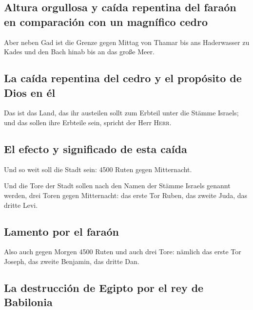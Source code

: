 \hypertarget{altura-orgullosa-y-cauxedda-repentina-del-farauxf3n-en-comparaciuxf3n-con-un-magnuxedfico-cedro}{%
\subsection{Altura orgullosa y caída repentina del faraón en comparación
con un magnífico
cedro}\label{altura-orgullosa-y-cauxedda-repentina-del-farauxf3n-en-comparaciuxf3n-con-un-magnuxedfico-cedro}}

 Aber neben Gad ist die Grenze gegen Mittag von Thamar
bis ans Haderwasser zu Kades und den Bach hinab bis an das große Meer.

\hypertarget{la-cauxedda-repentina-del-cedro-y-el-propuxf3sito-de-dios-en-uxe9l}{%
\subsection{La caída repentina del cedro y el propósito de Dios en
él}\label{la-cauxedda-repentina-del-cedro-y-el-propuxf3sito-de-dios-en-uxe9l}}

 Das ist das Land, das ihr austeilen sollt zum Erbteil
unter die Stämme Israels; und das sollen ihre Erbteile sein, spricht der
Herr \textsc{Herr}.

\hypertarget{el-efecto-y-significado-de-esta-cauxedda}{%
\subsection{El efecto y significado de esta
caída}\label{el-efecto-y-significado-de-esta-cauxedda}}

 Und so weit soll die Stadt sein: 4500 Ruten gegen
Mitternacht.

 Und die Tore der Stadt sollen nach den Namen der Stämme
Israels genannt werden, drei Toren gegen Mitternacht: das erste Tor
Ruben, das zweite Juda, das dritte Levi.

\hypertarget{lamento-por-el-farauxf3n}{%
\subsection{Lamento por el faraón}\label{lamento-por-el-farauxf3n}}

 Also auch gegen Morgen 4500 Ruten und auch drei Tore:
nämlich das erste Tor Joseph, das zweite Benjamin, das dritte Dan.

\hypertarget{la-destrucciuxf3n-de-egipto-por-el-rey-de-babilonia}{%
\subsection{La destrucción de Egipto por el rey de
Babilonia}\label{la-destrucciuxf3n-de-egipto-por-el-rey-de-babilonia}}

